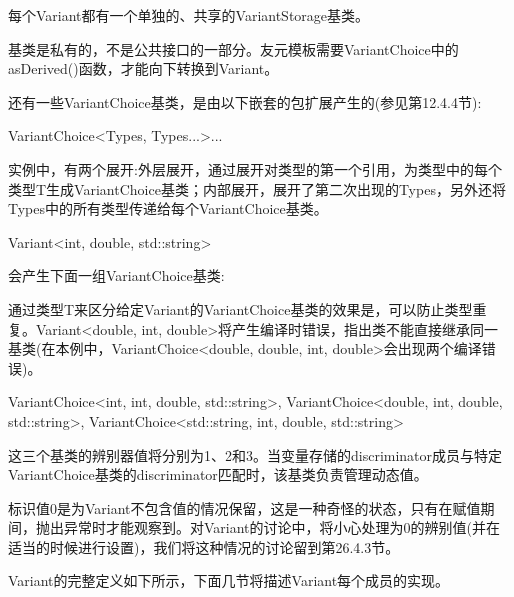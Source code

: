 每个Variant都有一个单独的、共享的VariantStorage基类。

\begin{notice}基类是私有的，不是公共接口的一部分。友元模板需要VariantChoice中的asDerived()函数，才能向下转换到Variant。
\end{notice}

还有一些VariantChoice基类，是由以下嵌套的包扩展产生的(参见第12.4.4节):

\begin{cpp}
VariantChoice<Types, Types...>...
\end{cpp}

实例中，有两个展开:外层展开，通过展开对类型的第一个引用，为类型中的每个类型T生成VariantChoice基类；内部展开，展开了第二次出现的Types，另外还将Types中的所有类型传递给每个VariantChoice基类。

\begin{cpp}
Variant<int, double, std::string>
\end{cpp}

会产生下面一组VariantChoice基类:

\begin{notice}通过类型T来区分给定Variant的VariantChoice基类的效果是，可以防止类型重复。Variant<double, int, double>将产生编译时错误，指出类不能直接继承同一基类(在本例中，VariantChoice<double, double, int, double>会出现两个编译错误)。
\end{notice}

\begin{cpp}
VariantChoice<int, int, double, std::string>,
VariantChoice<double, int, double, std::string>,
VariantChoice<std::string, int, double, std::string>
\end{cpp}

这三个基类的辨别器值将分别为1、2和3。当变量存储的discriminator成员与特定VariantChoice基类的discriminator匹配时，该基类负责管理动态值。

标识值0是为Variant不包含值的情况保留，这是一种奇怪的状态，只有在赋值期间，抛出异常时才能观察到。对Variant的讨论中，将小心处理为0的辨别值(并在适当的时候进行设置)，我们将这种情况的讨论留到第26.4.3节。

Variant的完整定义如下所示，下面几节将描述Variant每个成员的实现。

